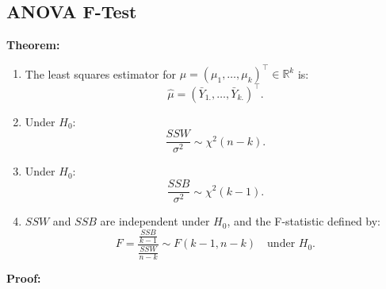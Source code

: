 \documentclass[open=any, 11pt,paper=A4]{scrreprt}
\begin{document}
\subsection{ANOVA F-Test}

\textbf{Theorem:}
\begin{enumerate}
    \item The least squares estimator for $\mu = (\mu_1, \ldots, \mu_k)^\top \in \mathbb{R}^k$ is:
    \[
    \hat{\mu} = (\bar{Y}_{1.}, \ldots, \bar{Y}_{k.})^\top.
    \]
    
    \item Under $H_0$:
    \[
    \frac{SSW}{\sigma^2} \sim \chi^2(n - k).
    \]
    
    \item Under $H_0$:
    \[
    \frac{SSB}{\sigma^2} \sim \chi^2(k - 1).
    \]
    
    \item $SSW$ and $SSB$ are independent under $H_0$, and the F-statistic defined by:
    \[
    F = \frac{\frac{SSB}{k - 1}}{\frac{SSW}{n - k}} \sim F(k - 1, n - k) \quad \text{under } H_0.
    \]
\end{enumerate}

\textbf{Proof:}
\end{document}
